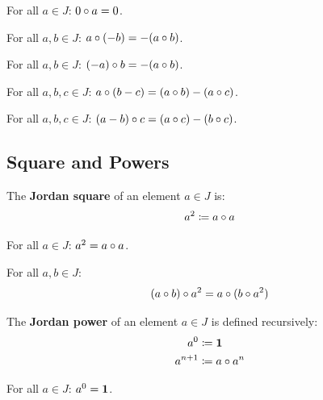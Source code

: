 \begin{lemma}
For all $a \in J$: $0 \circ a = 0$.
\end{lemma}

\begin{lemma}
For all $a, b \in J$: $a \circ (-b) = -(a \circ b)$.
\end{lemma}

\begin{lemma}
For all $a, b \in J$: $(-a) \circ b = -(a \circ b)$.
\end{lemma}

\begin{lemma}
For all $a, b, c \in J$: $a \circ (b - c) = (a \circ b) - (a \circ c)$.
\end{lemma}

\begin{lemma}
For all $a, b, c \in J$: $(a - b) \circ c = (a \circ c) - (b \circ c)$.
\end{lemma}

\subsection{Square and Powers}

\begin{definition}[jsq]
The \textbf{Jordan square} of an element $a \in J$ is:
\[ a^{2} \coloneqq a \circ a \]
\end{definition}

\begin{lemma}
For all $a \in J$: $a^{2} = a \circ a$.
\end{lemma}

\begin{theorem}
For all $a, b \in J$:
\[ (a \circ b) \circ a^{2} = a \circ (b \circ a^{2}) \]
\end{theorem}

\begin{definition}[jpow]
The \textbf{Jordan power} of an element $a \in J$ is defined recursively:
\begin{align*}
a^{0} &\coloneqq \mathbf{1} \\
a^{n+1} &\coloneqq a \circ a^{n}
\end{align*}
\end{definition}

\begin{lemma}
For all $a \in J$: $a^{0} = \mathbf{1}$.
\end{lemma}

